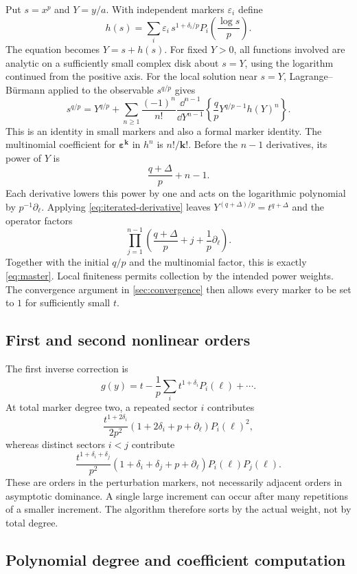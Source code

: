 \documentclass[11pt,a4paper]{article}
\numberwithin{equation}{section}
\theoremstyle{definition}\newtheorem{definition}[theorem]{Definition}
\theoremstyle{remark}\newtheorem{remark}[theorem]{Remark}
\newcommand{\D}{\partial_\ell}
\begin{document}
Put $s=x^p$ and $Y=y/a$. With independent markers $\varepsilon_i$ define
\[
 h(s)=\sum_i\varepsilon_i\,
 s^{1+\delta_i/p}P_i\!\left(\frac{\log s}{p}\right).
\]
The equation becomes $Y=s+h(s)$. For fixed $Y>0$, all functions involved
are analytic on a sufficiently small complex disk about $s=Y$, using the
logarithm continued from the positive axis. For the local solution near
$s=Y$, Lagrange--B\"urmann applied to the observable $s^{q/p}$ gives
\begin{equation}
 s^{q/p}=Y^{q/p}+
 \sum_{n\ge1}\frac{(-1)^n}{n!}
 \frac{\dd^{n-1}}{\dd Y^{n-1}}
 \left\{\frac qpY^{q/p-1}h(Y)^n\right\}.
 \label{eq:LB-observable}
\end{equation}
This is an identity in small markers and also a formal marker identity.
The multinomial coefficient for $\bm\varepsilon^{\bm k}$ in $h^n$ is
$n!/\bm k!$. Before the $n-1$ derivatives, its power of $Y$ is
\[
 \frac{q+\Delta}{p}+n-1.
\]
Each derivative lowers this power by one and acts on the logarithmic
polynomial by $p^{-1}\D$. Applying \cref{eq:iterated-derivative} leaves
$Y^{(q+\Delta)/p}=t^{q+\Delta}$ and the operator factors
\[
 \prod_{j=1}^{n-1}\left(\frac{q+\Delta}{p}+j+\frac1p\D\right).
\]
Together with the initial $q/p$ and the multinomial factor, this is exactly
\cref{eq:master}. Local finiteness permits collection by the intended
power weights. The convergence argument in \cref{sec:convergence} then
allows every marker to be set to $1$ for sufficiently small $t$.

\subsection{First and second nonlinear orders}

The first inverse correction is
\begin{equation}
 g(y)=t-\frac1p\sum_i t^{1+\delta_i}P_i(\ell)+\cdots.
 \label{eq:first-general}
\end{equation}
At total marker degree two, a repeated sector $i$ contributes
\[
 \frac{t^{1+2\delta_i}}{2p^2}
 (1+2\delta_i+p+\D)P_i(\ell)^2,
\]
whereas distinct sectors $i<j$ contribute
\[
 \frac{t^{1+\delta_i+\delta_j}}{p^2}
 (1+\delta_i+\delta_j+p+\D)P_i(\ell)P_j(\ell).
\]
These are orders in the perturbation markers, not necessarily adjacent
orders in asymptotic dominance. A single large increment can occur after
many repetitions of a smaller increment. The algorithm therefore sorts
by the actual weight, not by total degree.

\subsection{Polynomial degree and coefficient computation}
\end{document}
